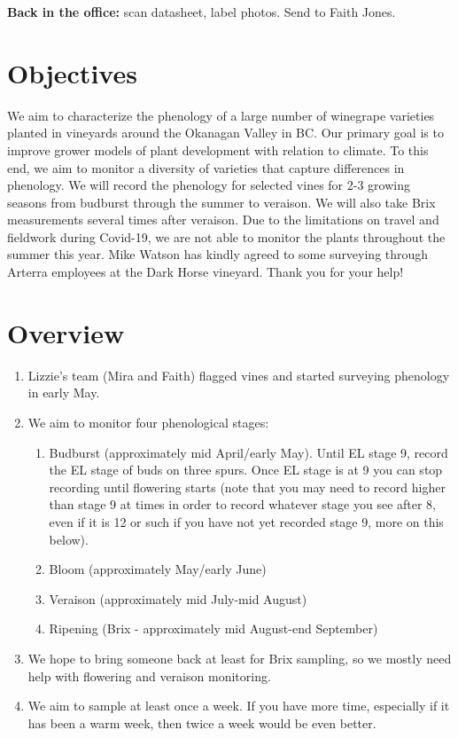 \documentclass[11pt,letter]{article}
\begin{document}
{\bf Back in the office:} scan datasheet, label photos. Send to Faith Jones.

\newpage

\section{Objectives}
We aim to characterize the phenology of a large number of winegrape varieties planted in vineyards around the Okanagan Valley in BC. Our primary goal is to improve grower models of plant development with relation to climate. To this end, we aim to monitor a diversity of varieties that capture differences in phenology. We will record the phenology for selected vines for 2-3 growing seasons from budburst through the summer to veraison. We will also take Brix measurements several times after veraison. Due to the limitations on travel and fieldwork during Covid-19, we are not able to monitor the plants throughout the summer this year. Mike Watson has kindly agreed to some surveying through Arterra employees at the Dark Horse vineyard. Thank you for your help!

\section{Overview}
\begin{enumerate}
  \item Lizzie's team (Mira and Faith) flagged vines and started surveying phenology in early May. %
  \item We aim to monitor four phenological stages:
  \begin{enumerate}
	\item Budburst (approximately mid April/early May). Until EL stage 9, record the EL stage of buds on three spurs. Once EL stage is at 9 you can stop recording until flowering starts (note that you may need to record higher than stage 9 at times in order to record whatever stage you see after 8, even if it is 12 or such if you have not yet recorded stage 9, more on this below).
	\item Bloom (approximately May/early June)
  	\item Veraison (approximately mid July-mid August)
  	\item Ripening (Brix - approximately mid August-end September)
  \end{enumerate}
  \item We hope to bring someone back at least for Brix sampling, so we mostly need help with flowering and veraison monitoring. 
  \item We aim to sample at least once a week. If you have more time, especially if it has been a warm week, then twice a week would be even better.

\end{enumerate}
\end{document}
